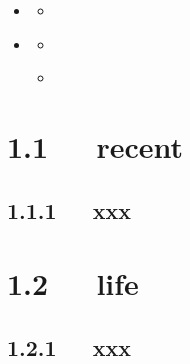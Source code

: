 \documentclass[letterpaper,12pt,english]{sphinxmanual}
\begin{document}
\begin{sphinxShadowBox}
\begin{itemize}
\begin{itemize}
\begin{itemize}
\end{itemize}

\item {} 
\label{\detokenize{000misc/memo:id25}}{\hyperref[\detokenize{000misc/memo:misc}]{}}
\begin{itemize}
\item {} 
\label{\detokenize{000misc/memo:id26}}{\hyperref[\detokenize{000misc/memo:id5}]{}}

\end{itemize}

\item {} 
\label{\detokenize{000misc/memo:id27}}{\hyperref[\detokenize{000misc/memo:temp}]{}}
\begin{itemize}
\item {} 
\label{\detokenize{000misc/memo:id28}}{\hyperref[\detokenize{000misc/memo:id6}]{}}

\item {} 
\label{\detokenize{000misc/memo:id29}}{\hyperref[\detokenize{000misc/memo:raw-materials}]{}}

\end{itemize}

\end{itemize}

\end{itemize}
\end{sphinxShadowBox}


\section{1.1   recent}
\label{\detokenize{000misc/memo:recent}}

\subsection{1.1.1   xxx}
\label{\detokenize{000misc/memo:xxx}}

\section{1.2   life}
\label{\detokenize{000misc/memo:life}}

\subsection{1.2.1   xxx}
\label{\detokenize{000misc/memo:id2}}
\end{document}
